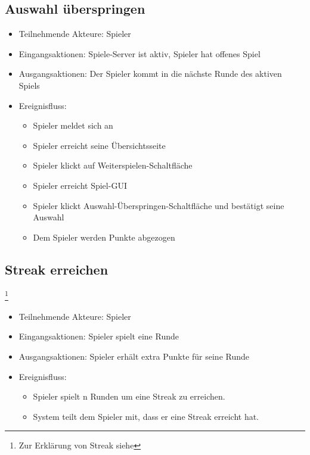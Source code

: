 \documentclass[a4paper]{scrreprt}
\begin{document}
	\subsection{Auswahl überspringen}
	\begin{itemize}
		\item Teilnehmende Akteure: \Gls{Spieler}
		\item Eingangsaktionen: Spiele-Server ist aktiv, \Gls{Spieler} hat offenes Spiel
        \item Ausgangsaktionen: Der \Gls{Spieler} kommt in die nächste Runde des aktiven Spiels
		\item Ereignisfluss:
		\begin{itemize}
			\item \Gls{Spieler} meldet sich an
			\item \Gls{Spieler} erreicht seine Übersichtsseite
			\item \Gls{Spieler} klickt auf Weiterspielen-Schaltfläche
			\item \Gls{Spieler} erreicht Spiel-GUI
			\item \Gls{Spieler} klickt Auswahl-Überspringen-Schaltfläche und bestätigt seine Auswahl
            \item Dem \Gls{Spieler} werden Punkte abgezogen
		\end{itemize}
	\end{itemize}
     
    \subsection{Streak erreichen}\footnote{Zur Erklärung von Streak siehe }
    \begin{itemize}
        \item Teilnehmende Akteure: \Gls{Spieler}
        \item Eingangsaktionen: \Gls{Spieler} spielt eine Runde
        \item Ausgangsaktionen: \Gls{Spieler} erhält extra Punkte für seine Runde
        \item Ereignisfluss:
        \begin{itemize}
            \item \Gls{Spieler} spielt n Runden um eine Streak zu erreichen.
            \item System teilt dem \Gls{Spieler} mit, dass er eine Streak erreicht hat.
        \end{itemize}
    \end{itemize}
    
\end{document}
